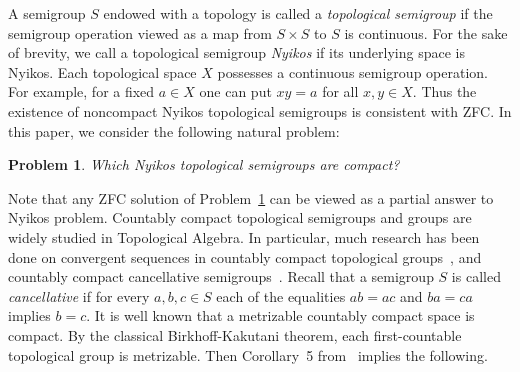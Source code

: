 \documentclass[12pt, twoside, leqno]{article}
\newtheorem{problem}[theorem]{Problem}
\theoremstyle{definition}
\numberwithin{equation}{section}
\begin{document}
A semigroup $S$ endowed with a topology is called a {\em topological semigroup} if the semigroup operation viewed as a map from $S{\times}S$ to $S$ is continuous.
For the sake of brevity, we call a topological semigroup {\em Nyikos} if its underlying space is Nyikos.  Each topological space $X$ possesses a continuous semigroup operation. For example, for a fixed $a\in X$ one can put $xy=a$ for all $x,y\in X$. Thus the existence of noncompact Nyikos topological semigroups is consistent with ZFC. In this paper, we consider the following natural problem:



\begin{problem}\label{my}
Which Nyikos topological semigroups are compact?    
\end{problem}

Note that any ZFC solution of Problem~\ref{my} can be viewed as a partial answer to Nyikos problem. 
Countably compact topological semigroups and groups are widely studied in Topological Algebra. In particular, much research has been done on convergent sequences in countably compact topological groups~\cite{BRT, BCST, DT,D,GTW,HvM, HMRS, KTW, T1,T2}, and countably compact cancellative semigroups~\cite{Grant,MT,RS,Wall}. Recall that a semigroup $S$ is called {\em cancellative} if for every $a,b,c\in S$ each of the equalities $ab=ac$ and $ba=ca$ implies $b=c$. It is well known that a metrizable countably compact space is compact. By the classical Birkhoff-Kakutani theorem, each first-countable topological group is metrizable.
Then Corollary~5 from~\cite{MT} implies the following.


\end{document}
